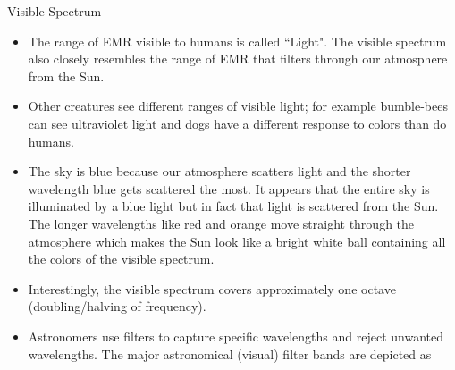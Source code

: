 {

\newlength{\nVSLength}	\setlength{\nVSLength}{0.56in}
\newlength{\nVSEnd}	\setlength{\nVSEnd}{0.001in+\nVSLength}
\newlength{\nRightSide}	\setlength{\nRightSide}{0in}
\newlength{\nLeftSide}	\setlength{\nLeftSide}{0in}

{\Large Visible Spectrum \hspace{0.07in}
}
\begin{itemize}

\item The range of EMR visible to humans is called ``Light". The visible spectrum also closely resembles the range of EMR that filters through our atmosphere from the Sun.

\item Other creatures see different ranges of visible light; for example bumble-bees can see ultraviolet light and dogs have a different response to colors than do humans.

\item The sky is blue because our atmosphere scatters light and the shorter wavelength blue gets scattered the most. It appears that the entire sky is illuminated by a blue light but in fact that light is scattered from the Sun. The longer wavelengths like red and orange move straight through the atmosphere which makes the Sun look like a bright white ball containing all the colors of the visible spectrum.

\item Interestingly, the visible spectrum covers approximately one octave (doubling/halving of frequency).

\item Astronomers use filters to capture specific wavelengths and reject unwanted wavelengths. The major astronomical (visual) filter bands are depicted as  

\end{itemize}
}
